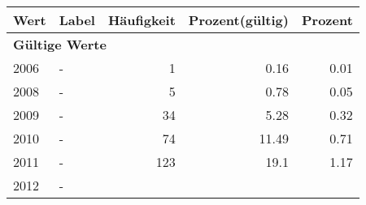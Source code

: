      \begin{longtable}{lXrrr}
     \toprule
     \textbf{Wert} & \textbf{Label} & \textbf{Häufigkeit} & \textbf{Prozent(gültig)} & \textbf{Prozent} \\
     \endhead
     \midrule
     \multicolumn{5}{l}{\textbf{Gültige Werte}}\\

     2006 &
     \multicolumn{1}{X}{ -  } &


       \num{1} &
       \num[round-mode=places,round-precision=2]{0.16} &
         \num[round-mode=places,round-precision=2]{0.01} \\

     2008 &
     \multicolumn{1}{X}{ -  } &


       \num{5} &
       \num[round-mode=places,round-precision=2]{0.78} &
         \num[round-mode=places,round-precision=2]{0.05} \\

     2009 &
     \multicolumn{1}{X}{ -  } &


       \num{34} &
       \num[round-mode=places,round-precision=2]{5.28} &
         \num[round-mode=places,round-precision=2]{0.32} \\

     2010 &
     \multicolumn{1}{X}{ -  } &


       \num{74} &
       \num[round-mode=places,round-precision=2]{11.49} &
         \num[round-mode=places,round-precision=2]{0.71} \\

     2011 &
     \multicolumn{1}{X}{ -  } &


       \num{123} &
       \num[round-mode=places,round-precision=2]{19.1} &
         \num[round-mode=places,round-precision=2]{1.17} \\

     2012 &
     \multicolumn{1}{X}{ -  } &



\end{longtable}
